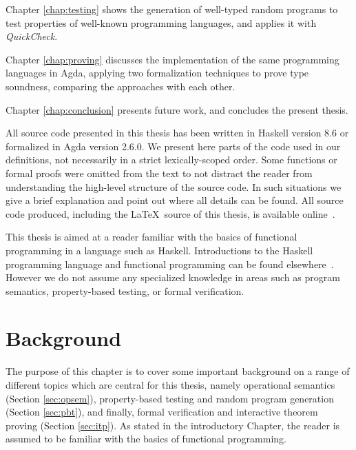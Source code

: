 \documentclass[tese,capa,english]{texufpel}
\begin{document}
\vspace{10pt}

Chapter \ref{chap:testing} shows the generation of well-typed random programs to test properties of well-known programming languages, and applies it with \emph{QuickCheck}.

\vspace{10pt}

Chapter \ref{chap:proving} discusses the implementation of the same programming languages in Agda, applying two formalization techniques to prove type soundness, comparing the approaches with each other.

\vspace{10pt}

Chapter \ref{chap:conclusion} presents future work, and concludes the present thesis.

\vspace{10pt}


\pagebreak

All source code presented in this thesis has been written in Haskell version 8.6 or formalized in Agda version 2.6.0. We present here parts of the code used in our definitions, not necessarily in a strict lexically-scoped order. Some functions or formal proofs were omitted from the text to not distract the reader from understanding the high-level structure of the source code. In such situations we give a brief explanation and point out where all details can be found. All source code produced, including the \LaTeX \ source of this thesis, is available online~\cite{repos}.

This thesis is aimed at a reader familiar with the basics of functional programming in a language such as Haskell. Introductions to the Haskell programming language and functional programming can be found elsewhere~\cite{mena2014beginning,lipovaca2011learn}. However we do not assume any specialized knowledge in areas such as program semantics, property-based testing, or formal verification.


\chapter{Background}
\label{chap:background}

The purpose of this chapter is to cover some important background on a range of different topics which are central for this thesis, namely operational semantics (Section \ref{sec:opsem}), property-based testing and random program generation (Section \ref{sec:pbt}), and finally, formal verification and interactive theorem proving (Section \ref{sec:itp}). As stated in the introductory Chapter, the reader is assumed to be familiar with the basics of functional programming.
\end{document}
